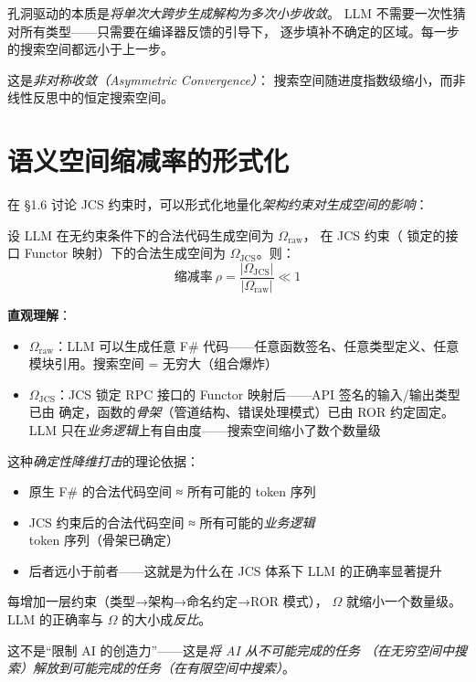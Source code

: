 \documentclass[10pt, openany]{book}
\begin{document}
\begin{principle}[非对称收敛]
    孔洞驱动的本质是\emph{将单次大跨步生成解构为多次小步收敛}。
    LLM 不需要一次性猜对所有类型——只需要在编译器反馈的引导下，
    逐步填补不确定的区域。每一步的搜索空间都远小于上一步。
    
    这是\emph{非对称收敛（Asymmetric Convergence）}：
    搜索空间随进度指数级缩小，而非线性反思中的恒定搜索空间。
\end{principle}

\section{语义空间缩减率的形式化}

在 \S1.6 讨论 JCS 约束时，可以形式化地量化\emph{架构约束对生成空间的影响}：

\begin{definition}[语义空间缩减率]
设 LLM 在无约束条件下的合法代码生成空间为 \(\Omega_{\text{raw}}\)，
在 JCS 约束（ 锁定的接口 Functor 映射）下的合法生成空间为
\(\Omega_{\text{JCS}}\)。则：
\[
\text{缩减率}\ \rho = \frac{|\Omega_{\text{JCS}}|}{|\Omega_{\text{raw}}|} \ll 1
\]
\end{definition}

\textbf{直观理解}：
\begin{itemize}
    \item \(\Omega_{\text{raw}}\)：LLM 可以生成任意 F\# 代码——任意函数签名、任意类型定义、任意模块引用。搜索空间 = 无穷大（组合爆炸）
    \item \(\Omega_{\text{JCS}}\)：JCS 锁定 RPC 接口的 Functor 映射后——API 签名的输入/输出类型已由  确定，函数的\emph{骨架}（管道结构、错误处理模式）已由 ROR 约定固定。LLM 只在\emph{业务逻辑}上有自由度——搜索空间缩小了数个数量级
\end{itemize}

这种\emph{确定性降维打击}的理论依据：
\begin{itemize}
    \item 原生 F\# 的合法代码空间 ≈ 所有可能的 token 序列
    \item JCS 约束后的合法代码空间 ≈ 所有可能的\emph{业务逻辑} token 序列（骨架已确定）
    \item 后者远小于前者——这就是为什么在 JCS 体系下 LLM 的正确率显著提升
\end{itemize}

\begin{principle}[约束即降维]
    每增加一层约束（类型→架构→命名约定→ROR 模式），
    \(\Omega\) 就缩小一个数量级。
    LLM 的正确率与 \(\Omega\) 的大小成\emph{反比}。
    
    这不是``限制 AI 的创造力''——这是\emph{将 AI 从不可能完成的任务
    （在无穷空间中搜索）解放到可能完成的任务（在有限空间中搜索）}。
\end{principle}
\end{document}
